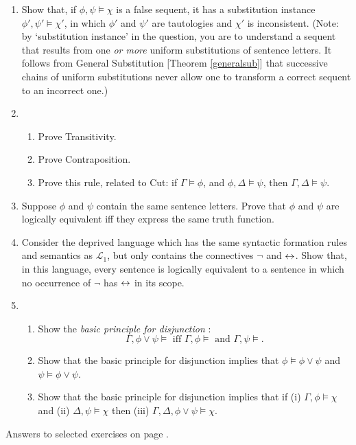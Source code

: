{\begin{enumerate}
\item Show that, if $\phi,\psi \vDash \chi$ is a false sequent,
it has a substitution instance $\phi',\psi' \vDash \chi'$, in which 
$\phi'$ and $\psi'$ are tautologies and $\chi'$ is
inconsistent. (Note: by `substitution instance' in the question, you are to understand a sequent that results from one \emph{or more} uniform substitutions of sentence letters. It follows from General Substitution [Theorem \ref{generalsub}] that successive chains of uniform substitutions never allow one to transform a correct sequent to an incorrect one.)

\item \begin{enumerate}
	\item Prove Transitivity.
	\item Prove Contraposition.
	\item Prove this rule, related to Cut: if $\Gamma \vDash \phi$, and $\phi,\Delta \vDash \psi$, then $\Gamma,\Delta \vDash \psi$.
\end{enumerate} 

\item Suppose $\phi$ and $\psi$ contain the same sentence letters. Prove that $\phi$ and $\psi$ are logically equivalent iff they express the same truth function.

\item Consider the deprived language which has the same syntactic formation rules and semantics as $\mathcal{L}_{1}$, but only contains the connectives $\neg$ and $\leftrightarrow$. Show that, in this language, every sentence is logically equivalent to a sentence in which no occurrence of $\neg$ has $\leftrightarrow$ in its scope.



\item \begin{enumerate}
	\item Show the \emph{basic principle for disjunction} \citep[§2.5]{bosintlo}: $$\Gamma, \phi\vee\psi \vDash  \text{ iff } \Gamma,\phi \vDash \text{ and } \Gamma,\psi \vDash.$$
	\item Show that the basic principle for disjunction implies that $\phi \vDash \phi \vee \psi$ and $\psi \vDash \phi \vee \psi$.
	\item Show that the basic principle for disjunction implies that  if (i) $\Gamma, \phi \vDash  \chi$ and (ii) $\Delta, \psi \vDash \chi$ then (iii) $\Gamma,\Delta, \phi \vee \psi \vDash \chi$.
\end{enumerate}
\end{enumerate}

Answers to selected exercises on page \pageref{ans4}.
}